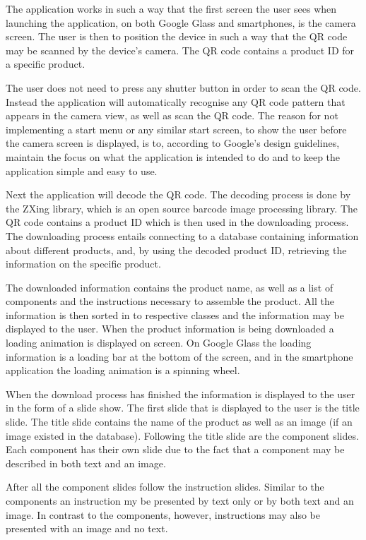 The application works in such a way that the first screen the user sees when launching the application, on both Google Glass and smartphones, is the camera screen. The user is then to position the device in such a way that the QR code may be scanned by the device's camera. The QR code contains a product ID for a specific product.

The user does not need to press any shutter button in order to scan the QR code. Instead the application will automatically recognise any QR code pattern that appears in the camera view, as well as scan the QR code. The reason for not implementing a start menu or any similar start screen, to show the user before the camera screen is displayed, is to, according to Google's design guidelines, maintain the focus on what the application is intended to do and to keep the application simple and easy to use.

Next the application will decode the QR code. The decoding process is done by the ZXing library, which is an open source  barcode image processing library. The QR code contains a product ID which is then used in the downloading process. The downloading process entails connecting to a database containing information about different products, and, by using the decoded product ID, retrieving the information on the specific product. 

The downloaded information contains the product name, as well as a list of components and the instructions necessary to assemble the product. All the information is then sorted in to respective classes and the information may be displayed to the user. When the product information is being downloaded a loading animation is displayed on screen. On Google Glass the loading information is a loading bar at the bottom of the screen, and in the smartphone application the loading animation is a spinning wheel.

When the download process has finished the information is displayed to the user in the form of a slide show. The first slide that is displayed to the user is the title slide. The title slide contains the name of the product as well as an image  (if an image existed in the database). Following the title slide are the component slides. Each component has their own slide due to the fact that a component may be described in both text and an image. 

After all the component slides follow the instruction slides. Similar to the components an instruction my be presented by text only or by both text and an image. In contrast to the components, however, instructions may also be presented with an image and no text. 


